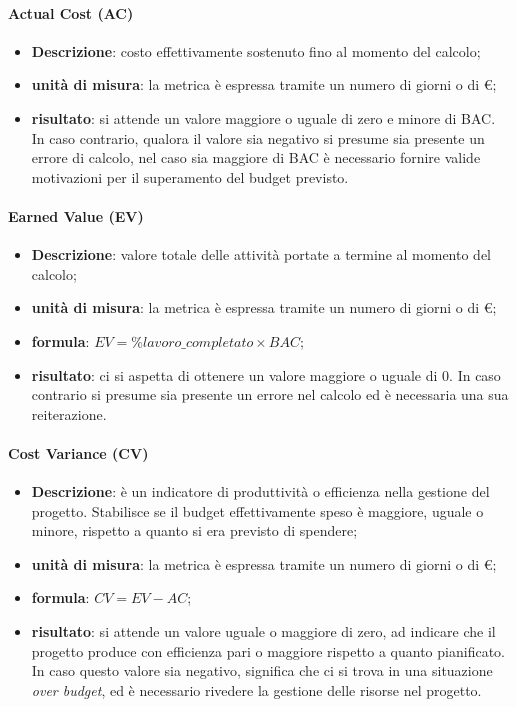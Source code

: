 				\paragraph{Actual Cost (AC)}
					\begin{itemize}
						\item \textbf{Descrizione}: costo effettivamente sostenuto fino al momento del calcolo;
						\item \textbf{unità di misura}: la metrica è espressa tramite un numero di giorni o di \euro;
						\item \textbf{risultato}: si attende un valore maggiore o uguale di zero e minore di BAC. In caso contrario, qualora il valore sia negativo si presume sia presente un errore di calcolo, nel caso sia maggiore di BAC è necessario fornire valide motivazioni per il superamento del budget previsto.
					\end{itemize}
				\paragraph{Earned Value (EV)}
					\begin{itemize}
						\item \textbf{Descrizione}: valore totale delle attività portate a termine al momento del calcolo;
						\item \textbf{unità di misura}: la metrica è espressa tramite un numero di giorni o di \euro;
						\item \textbf{formula}: $EV = \%lavoro\_completato \times BAC$;
						\item \textbf{risultato}: ci si aspetta di ottenere un valore maggiore o uguale di 0. In caso contrario si presume sia presente un errore nel calcolo ed è necessaria una sua reiterazione.
					\end{itemize}
				\paragraph{Cost Variance (CV)}
					\begin{itemize}
						\item \textbf{Descrizione}: è un indicatore di produttività o efficienza nella gestione del progetto. Stabilisce se il budget effettivamente speso è maggiore, uguale o minore, rispetto a quanto si era previsto di spendere;
						\item \textbf{unità di misura}: la metrica è espressa tramite un numero di giorni o di \euro;
						\item \textbf{formula}: $CV = EV - AC$;
						\item \textbf{risultato}: si attende un valore uguale o maggiore di zero, ad indicare che il progetto produce con efficienza pari o maggiore rispetto a quanto pianificato. In caso questo valore sia negativo, significa che ci si trova in una situazione \textit{over budget}, ed è necessario rivedere la gestione delle risorse nel progetto.
					\end{itemize}
